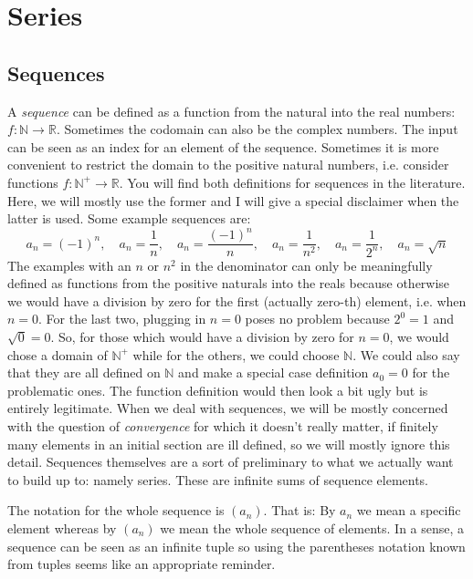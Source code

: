 \section{Series}

\subsection{Sequences}
A \emph{sequence} can be defined as a function from the natural into the real numbers: $f: \mathbb{N} \rightarrow \mathbb{R}$. Sometimes the codomain can also be the complex numbers. The input can be seen as an index for an element of the sequence. Sometimes it is more convenient to restrict the domain to the positive natural numbers, i.e. consider functions $f: \mathbb{N}^+ \rightarrow \mathbb{R}$. You will find both definitions for sequences in the literature. Here, we will mostly use the former and I will give a special disclaimer when the latter is used. Some example sequences are:
\begin{equation}
 a_n = (-1)^n,           \quad 
 a_n = \frac{1}{n},      \quad
 a_n = \frac{(-1)^n}{n}, \quad 
 a_n = \frac{1}{n^2},    \quad
 a_n = \frac{1}{2^n},    \quad  
 a_n = \sqrt{n}
\end{equation}
The examples with an $n$ or $n^2$ in the denominator can only be meaningfully defined as functions from the positive naturals into the reals because otherwise we would have a division by zero for the first (actually zero-th) element, i.e. when $n=0$. For the last two, plugging in $n=0$ poses no problem because $2^0=1$ and $\sqrt{0} = 0$. So, for those which would have a division by zero for $n=0$, we would chose a domain of $\mathbb{N}^+$ while for the others, we could choose $\mathbb{N}$. We could also say that they are all defined on $\mathbb{N}$ and make a special case definition $a_0 = 0$ for the problematic ones. The function definition would then look a bit ugly but is entirely legitimate. When we deal with sequences, we will be mostly concerned with the question of \emph{convergence} for which it doesn't really matter, if finitely many elements in an initial section are ill defined, so we will mostly ignore this detail. Sequences themselves are a sort of preliminary to what we actually want to build up to: namely series. These are infinite sums of sequence elements.

\medskip
The notation for the whole sequence is $(a_n)$. That is: By $a_n$ we mean a specific element whereas by $(a_n)$ we mean the whole sequence of elements. In a sense, a sequence can be seen as an infinite tuple so using the parentheses notation known from tuples seems like an appropriate reminder.

